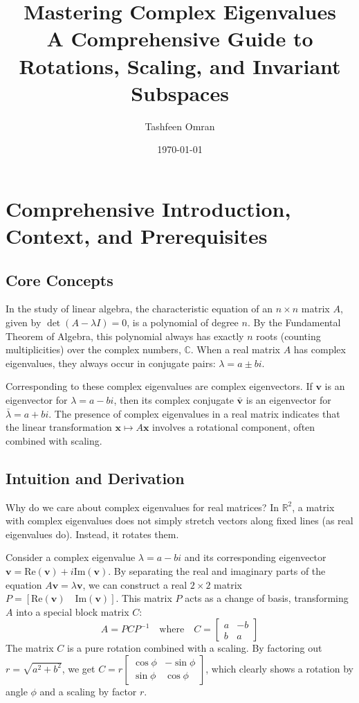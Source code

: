 \documentclass[11pt, letterpaper]{article}
\title{\Huge \textbf{Mastering Complex Eigenvalues} \\ \Large A Comprehensive Guide to Rotations, Scaling, and Invariant Subspaces}
\author{Tashfeen Omran}
\date{\today}
\theoremstyle{definition}
\theoremstyle{remark}
\newcommand{\R}{\mathbb{R}}
\begin{document}
\maketitle
\tableofcontents
\newpage

\section{Comprehensive Introduction, Context, and Prerequisites}

\subsection{Core Concepts}
In the study of linear algebra, the characteristic equation of an $n \times n$ matrix $A$, given by $\det(A - \lambda I) = 0$, is a polynomial of degree $n$. By the Fundamental Theorem of Algebra, this polynomial always has exactly $n$ roots (counting multiplicities) over the complex numbers, $\mathbb{C}$. When a real matrix $A$ has complex eigenvalues, they always occur in conjugate pairs: $\lambda = a \pm bi$. 

Corresponding to these complex eigenvalues are complex eigenvectors. If $\mathbf{v}$ is an eigenvector for $\lambda = a - bi$, then its complex conjugate $\bar{\mathbf{v}}$ is an eigenvector for $\bar{\lambda} = a + bi$. The presence of complex eigenvalues in a real matrix indicates that the linear transformation $\mathbf{x} \mapsto A\mathbf{x}$ involves a rotational component, often combined with scaling.

\subsection{Intuition and Derivation}
Why do we care about complex eigenvalues for real matrices? In $\R^2$, a matrix with complex eigenvalues does not simply stretch vectors along fixed lines (as real eigenvalues do). Instead, it rotates them. 

Consider a complex eigenvalue $\lambda = a - bi$ and its corresponding eigenvector $\mathbf{v} = \text{Re}(\mathbf{v}) + i\text{Im}(\mathbf{v})$. By separating the real and imaginary parts of the equation $A\mathbf{v} = \lambda\mathbf{v}$, we can construct a real $2 \times 2$ matrix $P = [\text{Re}(\mathbf{v}) \quad \text{Im}(\mathbf{v})]$. This matrix $P$ acts as a change of basis, transforming $A$ into a special block matrix $C$:
\[
A = PCP^{-1} \quad \text{where} \quad C = \begin{bmatrix} a & -b \\ b & a \end{bmatrix}
\]
The matrix $C$ is a pure rotation combined with a scaling. By factoring out $r = \sqrt{a^2 + b^2}$, we get $C = r \begin{bmatrix} \cos\phi & -\sin\phi \\ \sin\phi & \cos\phi \end{bmatrix}$, which clearly shows a rotation by angle $\phi$ and a scaling by factor $r$.
\end{document}
